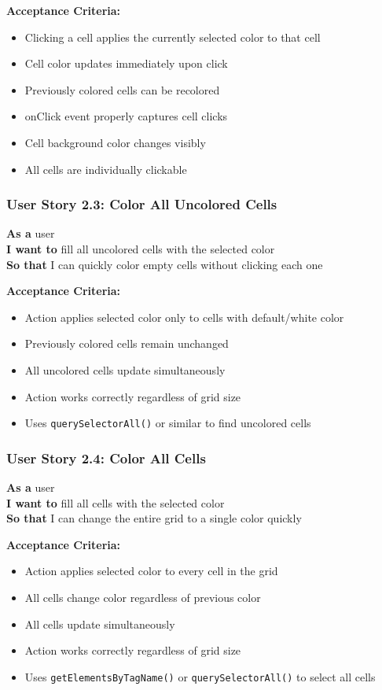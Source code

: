 \documentclass[11pt,a4paper]{article}
\begin{document}
\textbf{Acceptance Criteria:}
\begin{itemize}[leftmargin=*]
    \item Clicking a cell applies the currently selected color to that cell
    \item Cell color updates immediately upon click
    \item Previously colored cells can be recolored
    \item onClick event properly captures cell clicks
    \item Cell background color changes visibly
    \item All cells are individually clickable
\end{itemize}

\subsubsection{User Story 2.3: Color All Uncolored Cells}
\textbf{As a} user\\
\textbf{I want to} fill all uncolored cells with the selected color\\
\textbf{So that} I can quickly color empty cells without clicking each one

\textbf{Acceptance Criteria:}
\begin{itemize}[leftmargin=*]
    \item Action applies selected color only to cells with default/white color
    \item Previously colored cells remain unchanged
    \item All uncolored cells update simultaneously
    \item Action works correctly regardless of grid size
    \item Uses \texttt{querySelectorAll()} or similar to find uncolored cells
\end{itemize}

\subsubsection{User Story 2.4: Color All Cells}
\textbf{As a} user\\
\textbf{I want to} fill all cells with the selected color\\
\textbf{So that} I can change the entire grid to a single color quickly

\textbf{Acceptance Criteria:}
\begin{itemize}[leftmargin=*]
    \item Action applies selected color to every cell in the grid
    \item All cells change color regardless of previous color
    \item All cells update simultaneously
    \item Action works correctly regardless of grid size
    \item Uses \texttt{getElementsByTagName()} or \texttt{querySelectorAll()} to select all cells
\end{itemize}
\end{document}
